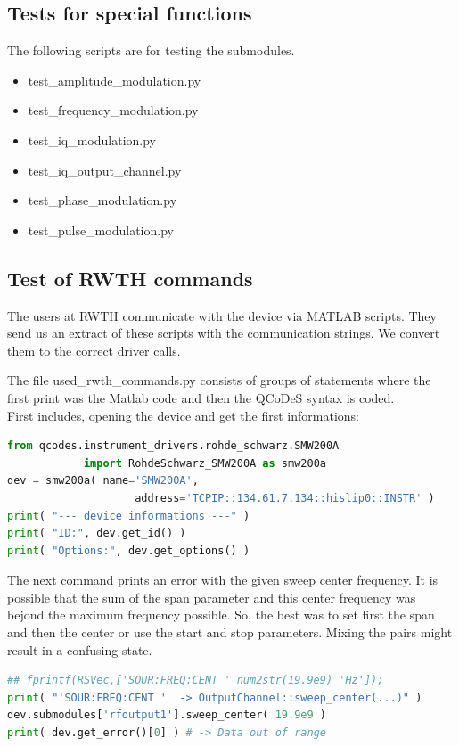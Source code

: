 \documentclass[11pt]{article} %
\begin{document}
\subsection{Tests for special functions}
The following scripts are for testing the submodules.
\begin{itemize}
\item test\_amplitude\_modulation.py
\item test\_frequency\_modulation.py
\item test\_iq\_modulation.py
\item test\_iq\_output\_channel.py
\item test\_phase\_modulation.py
\item test\_pulse\_modulation.py
\end{itemize}

\subsection{Test of RWTH commands}
The users at RWTH communicate with the device via MATLAB scripts. They send us an extract of these scripts with the communication strings. We convert them to the correct driver calls.

The file used\_rwth\_commands.py consists of groups of statements where the first print was the Matlab code and then the QCoDeS syntax is coded.
\\[0.5em]
First includes, opening the device and get the first informations:
\begin{lstlisting}[frame=single, language=Python]
from qcodes.instrument_drivers.rohde_schwarz.SMW200A
			import RohdeSchwarz_SMW200A as smw200a
dev = smw200a( name='SMW200A',
           	        address='TCPIP::134.61.7.134::hislip0::INSTR' )
print( "--- device informations ---" )
print( "ID:", dev.get_id() )
print( "Options:", dev.get_options() )
\end{lstlisting}

The next command prints an error with the given sweep center frequency. It is possible that the sum of the span parameter and this center frequency was bejond the maximum frequency possible. So, the best was to set first the span and then the center or use the start and stop parameters. Mixing the pairs might result in a confusing state.
\begin{lstlisting}[frame=single, language=Python]
## fprintf(RSVec,['SOUR:FREQ:CENT ' num2str(19.9e9) 'Hz']);
print( "'SOUR:FREQ:CENT '  -> OutputChannel::sweep_center(...)" )
dev.submodules['rfoutput1'].sweep_center( 19.9e9 )
print( dev.get_error()[0] ) # -> Data out of range
\end{lstlisting}
\end{document}
